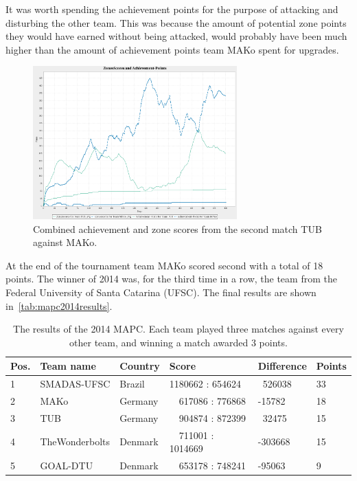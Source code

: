 It was worth spending the achievement points for the purpose of attacking and disturbing the other team.
This was because the amount of potential zone points they would have earned without being attacked, would probably have been much higher than the amount of achievement points team MAKo spent for upgrades.
\begin{figure}[h]
	\centering
	\includegraphics[width=0.7\textwidth]{images/ZonesScoresAndAchievementPoints.png}
	\caption{Combined achievement and zone scores from the second match TUB against MAKo.} %
	\label{dis:ZonesScoresAndAchievementPoints}
\end{figure}
At the end of the tournament team MAKo scored second with a total of 18 points.
The winner of 2014 was, for the third time in a row, the team from the Federal University of Santa Catarina (UFSC).
The final results are shown in~\autoref{tab:mapc2014results}.
\begin{table}[ht]
  \centering
  \label{tab:mapc2014results}
  \begin{tabularx}{\textwidth}{| l | X | p{2cm} | X | p{2cm} | l |}
    \hline
    \textbf{Pos.} & \textbf{Team name} & \textbf{Country} & \textbf{Score}       & \textbf{Difference} & \textbf{Points} \\ \hline
    1             & SMADAS-UFSC        & Brazil           & 1180662 : 654624     & \ 526038            & 33              \\
    2             & MAKo               & Germany          & \ \ 617086 : 776868  & -15782              & 18              \\
    3             & TUB                & Germany          & \ \ 904874 : 872399  & \ 32475             & 15              \\
    4             & TheWonderbolts     & Denmark          & \ \ 711001 : 1014669 & -303668             & 15              \\
    5             & GOAL-DTU           & Denmark          & \ \ 653178 : 748241  & -95063              & 9               \\ \hline
  \end{tabularx}
  \caption{The results of the 2014 MAPC. Each team played three matches against every other team, and winning a match awarded 3 points.}
\end{table}
